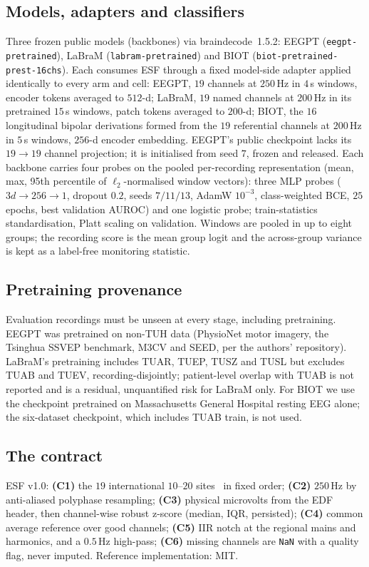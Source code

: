 \documentclass[conference]{IEEEtran}
\newcommand{\EEGPTPRETRAIN}{(PhysioNet motor imagery, the Tsinghua SSVEP benchmark, M3CV and SEED, per the authors' repository)}
\begin{document}
\subsection{Models, adapters and classifiers}
\label{sec:backbone}
Three frozen public models (backbones) via braindecode~1.5.2: EEGPT
(\texttt{eegpt-pretrained}), LaBraM (\texttt{labram-pretrained}) and
BIOT (\texttt{biot-pretrained-prest-16chs}). Each consumes ESF through
a fixed model-side adapter applied identically to every arm and cell:
EEGPT, $19$ channels at $250$\,Hz in $4$\,s windows, encoder tokens
averaged to $512$-d; LaBraM, $19$ named channels at $200$\,Hz in its
pretrained $15$\,s windows, patch tokens averaged to $200$-d; BIOT, the
$16$ longitudinal bipolar derivations formed from the $19$ referential
channels at $200$\,Hz in $5$\,s windows, $256$-d encoder embedding.
EEGPT's public checkpoint lacks its $19{\to}19$ channel projection; it
is initialised from seed $7$, frozen and released. Each backbone
carries four probes on the pooled per-recording representation (mean,
max, 95th percentile of $\ell_2$-normalised window vectors): three MLP
probes ($3d{\to}256{\to}1$, dropout $0.2$, seeds $7/11/13$, AdamW
$10^{-3}$, class-weighted BCE, $25$ epochs, best validation AUROC) and
one logistic probe; train-statistics standardisation, Platt scaling on
validation. Windows are pooled in up to eight groups; the recording
score is the mean group logit and the across-group variance is kept as
a label-free monitoring statistic.

\subsection{Pretraining provenance}
\label{sec:provenance}
Evaluation recordings must be unseen at every stage, including
pretraining. EEGPT was pretrained on non-TUH data \EEGPTPRETRAIN.
LaBraM's pretraining includes TUAR, TUEP, TUSZ and TUSL but excludes
TUAB and TUEV, recording-disjointly; patient-level overlap with TUAB is
not reported and is a residual, unquantified risk for LaBraM only. For
BIOT we use the checkpoint pretrained on Massachusetts General Hospital
resting EEG alone; the six-dataset checkpoint, which includes TUAB
train, is not used.

\subsection{The contract}
\label{sec:esf}
ESF v1.0: \textbf{(C1)} the $19$ international $10$--$20$
sites~\cite{klem1999tenten} in fixed order; \textbf{(C2)} $250$\,Hz by
anti-aliased polyphase resampling; \textbf{(C3)} physical microvolts
from the EDF header, then channel-wise robust z-score (median, IQR,
persisted); \textbf{(C4)} common average reference over good channels;
\textbf{(C5)} IIR notch at the regional mains and harmonics, and a
$0.5$\,Hz high-pass; \textbf{(C6)} missing channels are \texttt{NaN}
with a quality flag, never imputed. Reference implementation: MIT.
\end{document}
